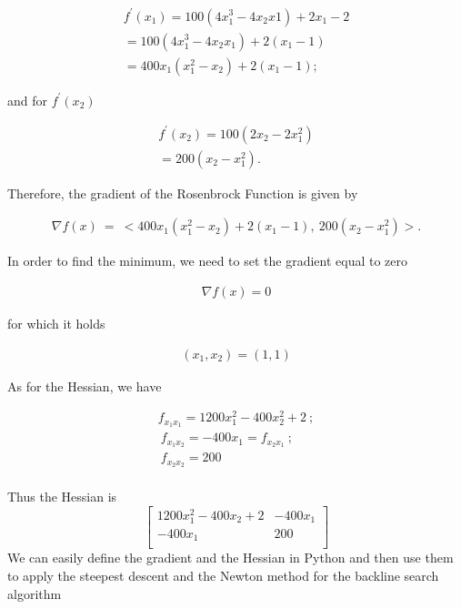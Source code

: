 \documentclass[11pt]{article}
\begin{document}
\begin{align}
f^{\prime}(x_{1}) = 100(4x_{1}^{3}-4x_{2}x{1})+2x_{1}-2\\
= 100(4x_{1}^3-4x_{2}x_{1})+2(x_{1}-1)\\
= 400x_{1}(x_{1}^{2}-x_{2})+2(x_{1}-1);
\end{align}

and for \(f^{\prime}(x_{2})\)

\begin{align}
f^{\prime}(x_{2}) = 100(2x_{2}-2x_{1}^2)\\
= 200(x_{2}-x_{1}^{2}).
\end{align}

Therefore, the gradient of the Rosenbrock Function is given by

\begin{align}
\nabla{f(x)} ~= ~<400x_{1}(x_{1}^{2}-x_{2})+2(x_{1}-1),~200(x_{2}-x_{1}^{2})>.
\end{align}

In order to find the minimum, we need to set the gradient equal to zero

\begin{align}
\nabla{f(x)} = 0
\end{align}

for which it holds

\begin{align}
(x_{1},x_{2}) = (1,1)
\end{align}

As for the Hessian, we have

\begin{align}
f_{x_{1}x_{1}} = 1200x_{1}^{2}-400x_{2}^{2}+2~;\\
\
f_{x_{1}x_{2}} = -400x_{1} = f_{x_{2}x_{1}}~;\\
\
f_{x_{2}x_{2}} = 200\\
\end{align}

Thus the Hessian is
$$
\begin{bmatrix}
1200x_{1}^{2}-400x_{2}+2 & -400x_{1}\\
-400x_{1} & 200\\
\end{bmatrix}
$$
We can easily define the gradient and the Hessian in Python and then use
them to apply the steepest descent and the Newton method for the
backline search algorithm
\end{document}
